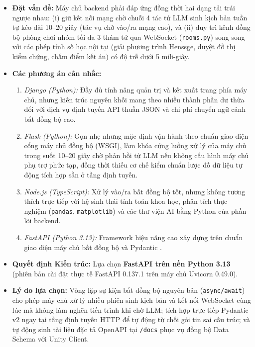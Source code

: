 \begin{itemize}[leftmargin=1.5cm]
    \item \textbf{Đặt vấn đề:} Máy chủ backend phải đáp ứng đồng thời hai dạng tải trái ngược nhau: (i) giữ kết nối mạng chờ chuỗi 4 tác tử LLM sinh kịch bản tuần tự kéo dài 10--20 giây (tác vụ chờ vào/ra mạng cao), và (ii) duy trì kênh đồng bộ phòng chơi nhóm tối đa 3 thám tử qua WebSocket (\texttt{rooms.py}) song song với các phép tính số học nội tại (giải phương trình Henssge, duyệt đồ thị kiểm chứng, chấm điểm kết án) có độ trễ dưới 5 mili-giây.
    \item \textbf{Các phương án cân nhắc:}
    \begin{enumerate}
        \item \textit{Django (Python):} Đầy đủ tính năng quản trị và kết xuất trang phía máy chủ, nhưng kiến trúc nguyên khối mang theo nhiều thành phần dư thừa đối với dịch vụ định tuyến API thuần JSON và chi phí chuyển ngữ cảnh bất đồng bộ cao.
        \item \textit{Flask (Python):} Gọn nhẹ nhưng mặc định vận hành theo chuẩn giao diện cổng máy chủ đồng bộ (WSGI), làm khóa cứng luồng xử lý của máy chủ trong suốt 10--20 giây chờ phản hồi từ LLM nếu không cấu hình máy chủ phụ trợ phức tạp, đồng thời thiếu cơ chế kiểm chuẩn lược đồ dữ liệu tự động tích hợp sẵn ở tầng định tuyến.
        \item \textit{Node.js (TypeScript):} Xử lý vào/ra bất đồng bộ tốt, nhưng không tương thích trực tiếp với hệ sinh thái tính toán khoa học, phân tích thực nghiệm (\texttt{pandas}, \texttt{matplotlib}) và các thư viện AI bằng Python của phần lõi backend.
        \item \textit{FastAPI (Python 3.13):} Framework hiệu năng cao xây dựng trên chuẩn giao diện máy chủ bất đồng bộ và Pydantic \cite{fastapi2024}.
    \end{enumerate}
    \item \textbf{Quyết định Kiến trúc:} Lựa chọn \textbf{FastAPI trên nền Python 3.13} (phiên bản cài đặt thực tế FastAPI 0.137.1 trên máy chủ Uvicorn 0.49.0).
    \item \textbf{Lý do lựa chọn:} Vòng lặp sự kiện bất đồng bộ nguyên bản (\texttt{async/await}) cho phép máy chủ xử lý nhiều phiên sinh kịch bản và kết nối WebSocket cùng lúc mà không làm nghẽn tiến trình khi chờ LLM; tích hợp trực tiếp Pydantic v2 ngay tại tầng định tuyến HTTP để tự động từ chối gói tin sai cấu trúc; và tự động sinh tài liệu đặc tả OpenAPI tại \texttt{/docs} phục vụ đồng bộ Data Schema với Unity Client.
\end{itemize}

